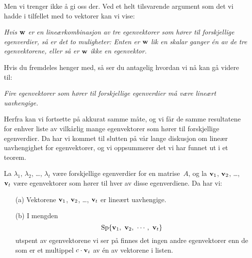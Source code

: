 Men vi trenger ikke å gi oss der.  Ved et helt tilsvarende argument
som det vi hadde i tilfellet med to vektorer kan
vi vise:

\smallskip
\noindent\emph{Hvis $\mathbf{w}$ er en lineærkombinasjon av tre egenvektorer som
  hører til forskjellige egenverdier, så er det to muligheter: Enten
  er $\mathbf{w}$ lik en skalar ganger én av de tre egenvektorene, eller så
  er $\mathbf{w}$ ikke en egenvektor.}
\smallskip

Hvis du fremdeles henger med, så ser du antagelig hvordan vi nå kan gå
videre til:

\smallskip
\noindent\emph{Fire egenvektorer som hører til forskjellige egenverdier
  må være lineært uavhengige.}
\smallskip

Herfra kan vi fortsette på akkurat samme måte, og vi får de samme
resultatene for enhver liste av vilkårlig mange egenvektorer som hører
til forskjellige egenverdier.  Da har vi kommet til slutten på vår
lange diskusjon om lineær uavhengighet for egenvektorer, og vi
oppsummerer det vi har funnet ut i et teorem.

\begin{thm}
\label{thm:egenvektorer-lin-uavh}
La $\lambda_1$, $\lambda_2$, \ldots, $\lambda_t$ være
forskjellige egenverdier for en matrise~$A$, og la $\mathbf{v}_1$,
$\mathbf{v}_2$, \ldots, $\mathbf{v}_t$ være egenvektorer som hører til hver av
disse egenverdiene.  Da har vi:
\begin{enumerate}
\item[(a)] Vektorene $\mathbf{v}_1$, $\mathbf{v}_2$, \ldots, $\mathbf{v}_t$ er lineært uavhengige.
\item[(b)] I mengden
\[
\operatorname{Sp} \{ \mathbf{v}_1,\ \mathbf{v}_2,\ \cdots,\ \mathbf{v}_t \}
\]
utspent av egenvektorene vi ser på finnes det ingen andre egenvektorer
enn de som er et multippel $c \cdot \mathbf{v}_i$ av én av vektorene i
listen.
\end{enumerate}
\end{thm}


\kapittelslutt
